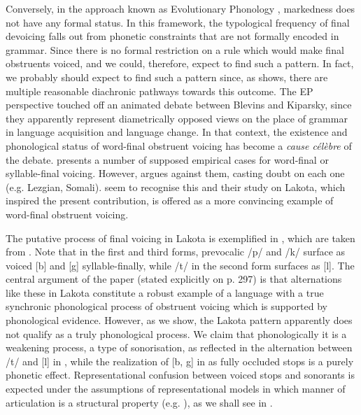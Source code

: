 \documentclass[output=paper]{langscibook}
\begin{document}
Conversely, in the approach known as Evolutionary Phonology \citep{Blevins2004}, markedness does not have any formal status. In this framework, the typological frequency of final devoicing falls out from phonetic constraints that are not formally encoded in grammar. Since there is no formal restriction on a rule which would make final obstruents voiced, and we could, therefore, expect to find such a pattern. In fact, we probably should expect to find such a pattern since, as \citet{Kiparsky2006} shows, there are multiple reasonable diachronic pathways towards this outcome. The EP perspective touched off an animated debate between Blevins and Kiparsky, since they apparently represent diametrically opposed views on the place of grammar in language acquisition and language change. In that context, the existence and phonological status of word-final obstruent voicing has become a \textit{cause célèbre} of the debate. \citet{Blevins2004} presents a number of supposed empirical cases for word-final or syllable{}-final voicing. However, \citet{Kiparsky2006} argues against them, casting doubt on each one (e.g. Lezgian, Somali). \citet{BlevinsEtAl2020} seem to recognise this and their study on Lakota, which inspired the present contribution, is offered as a more convincing example of word-final obstruent voicing.

 The putative process of final voicing in Lakota is exemplified in , which are taken from \citet[301]{BlevinsEtAl2020}. Note that in the first and third forms, prevocalic /p/ and /k/ surface as voiced [b] and [g] syllable-finally, while /t/ in the second form surfaces as [l]. The central argument of the \citet{BlevinsEtAl2020}  paper (stated explicitly on p. 297) is that alternations like these in Lakota constitute a robust example of a language with a true synchronic phonological process of obstruent voicing which is supported by phonological evidence. However, as we show, the Lakota pattern apparently does not qualify as a truly phonological process. We claim that phonologically it is a weakening process, a type of sonorisation, as reflected in the alternation between /t/ and [l] in , while the realization of [b, g] in  as fully occluded stops is a purely phonetic effect. Representational confusion between voiced stops and sonorants is expected under the assumptions of representational models in which manner of articulation is a structural property (e.g. \citealt{Steriade1993,Schwartz2016}), as we shall see in .
\end{document}
